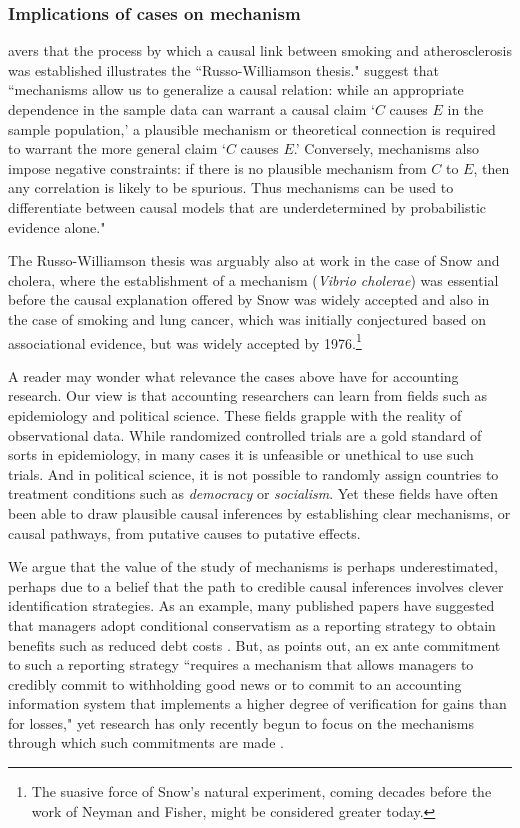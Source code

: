 \documentclass[11pt]{amsart}
\begin{document}

\subsubsection{Implications of cases on mechanism}
 \citet{Gillies2011-GILTRT-3} avers that the process by which a causal link between smoking and atherosclerosis was established illustrates the ``Russo-Williamson thesis."
 \citet[p.\,159]{Russo:2007iz} suggest that ``mechanisms allow us to generalize a causal relation: while an appropriate dependence in the sample data can warrant a causal claim `$C$ causes $E$ in the sample population,' a plausible mechanism or theoretical connection is required to warrant the more general claim `$C$ causes $E$.' Conversely, mechanisms also impose negative constraints: if there is no plausible mechanism from $C$ to $E$, then any correlation is likely to be spurious. Thus mechanisms can be used to differentiate between causal models that are underdetermined by probabilistic evidence alone."

The Russo-Williamson thesis was arguably also at work in the case of Snow and cholera, where the establishment of a mechanism (\emph{Vibrio cholerae}) was essential before the causal explanation offered by Snow was widely accepted and also in the case of smoking and lung cancer, which was initially conjectured based on associational evidence, but was widely accepted by 1976.\footnote{
 The suasive force of Snow's natural experiment, coming decades before the work of Neyman and Fisher, might be considered greater today.}

A reader may wonder what relevance the cases above have for accounting research.
Our view is that accounting researchers can learn from fields such as epidemiology and political science. 
These fields grapple with the reality of observational data.
While randomized controlled trials are a gold standard of sorts in epidemiology, in many cases it is unfeasible or unethical to use such trials.
And in political science, it is not possible to randomly assign countries to treatment conditions such as \emph{democracy} or \emph{socialism}.
Yet these fields have often been able to draw plausible causal inferences by establishing clear mechanisms, or causal pathways, from putative causes to putative effects.

We argue that the value of the study of mechanisms is perhaps underestimated, perhaps due to a belief that the path to credible causal inferences involves clever identification strategies.
As an example, many published papers have suggested that managers adopt conditional conservatism as a reporting strategy to obtain benefits such as reduced debt costs \citep{Ahmed:2002aa,Zhang:2008bc}.
But, as \citet[p\,317]{Beyer:2010cj} points out, an ex ante commitment to such a reporting strategy ``requires a mechanism that allows managers to credibly commit to withholding good news or to commit to an accounting information system that implements a higher degree of verification for gains than for losses," yet research has only recently begun to focus on the mechanisms through which such commitments are made \citep[e.g.,][]{Erkens:2014hj}.
\end{document}
